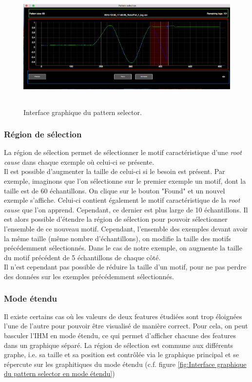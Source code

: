 \begin{figure}[H]
	\centering\includegraphics[height=6.4cm]{images/pattern_selector.png}
	\caption[Interface graphique du pattern selector]{Interface graphique du pattern selector.}
	\label{fig:Interface graphique du pattern selector}
\end{figure}

\subsubsection{Région de sélection}
\label{Industrialisation du produit: Outils graphiques: Pattern selection: La région de sélection}
La région de sélection permet de sélectionner le motif caractéristique d'une \emph{root cause} dans chaque exemple où celui-ci se présente. \\
 Il est possible d'augmenter la taille de celui-ci si le besoin est présent. Par exemple, imaginons que l'on sélectionne sur le premier exemple un motif, dont la taille est de 60 échantillons. On clique sur le bouton "Found" et un nouvel exemple s'affiche. Celui-ci contient également le motif caractéristique de la \emph{root cause} que l'on apprend. Cependant, ce dernier est plus large de 10 échantillons. Il est alors possible d'étendre la région de sélection pour pouvoir sélectionner l'ensemble de ce nouveau motif. Cependant, l'ensemble des exemples devant avoir la même taille (même nombre d'échantillons), on modifie la taille des motifs précédemment sélectionnés. Dans le cas de notre exemple, on augmente la taille du motif précédent de 5 échantillons de chaque côté. \\
Il n'est cependant pas possible de réduire la taille d'un motif, pour ne pas perdre des données sur les exemples précédemment sélectionnés. 

\subsubsection{Mode étendu}
\label{Industrialisation du produit: Outils graphiques: Pattern selection: Mode étendu}
Il existe certains cas où les valeurs de deux features étudiées sont trop éloignées l'une de l'autre pour pouvoir être visualisé de manière correct. Pour cela, on peut basculer l'IHM en mode étendu, ce qui permet d'afficher chacune des features dans un graphique séparé. La région de sélection est commune aux différents graphe, i.e. sa taille et sa position est contrôlée via le graphique principal et se répercute sur les graphitiques du mode étendu (c.f. figure \ref{fig:Interface graphique du pattern selector en mode étendu})

